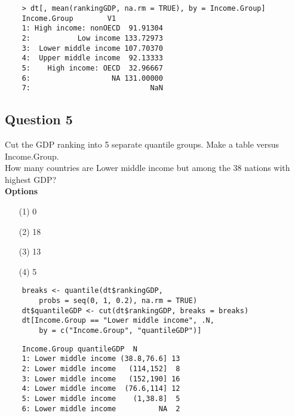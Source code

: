 \documentclass[]{article}
\begin{document}

\begin{framed}
	\begin{verbatim}
	> dt[, mean(rankingGDP, na.rm = TRUE), by = Income.Group]
	Income.Group        V1
	1: High income: nonOECD  91.91304
	2:           Low income 133.72973
	3:  Lower middle income 107.70370
	4:  Upper middle income  92.13333
	5:    High income: OECD  32.96667
	6:                   NA 131.00000
	7:                            NaN
	\end{verbatim}
\end{framed}
\newpage
\subsection*{Question 5}
Cut the GDP ranking into 5 separate quantile groups. Make a table versus Income.Group.
\\
 How many countries are Lower middle income but among the 38 nations with highest GDP?\\
\bigskip
\textbf{Options}
\begin{itemize}
\item[(1)] 0
\item[(2)]18
\item[(3)]13
\item[(4)] 5
\end{itemize}


\begin{framed}
	\begin{verbatim}
	breaks <- quantile(dt$rankingGDP, 
	  	probs = seq(0, 1, 0.2), na.rm = TRUE)
	dt$quantileGDP <- cut(dt$rankingGDP, breaks = breaks)
	dt[Income.Group == "Lower middle income", .N, 
	   	by = c("Income.Group", "quantileGDP")]
	   		\end{verbatim}
\end{framed}
	   \begin{verbatim}	
	Income.Group quantileGDP  N
	1: Lower middle income (38.8,76.6] 13
	2: Lower middle income   (114,152]  8
	3: Lower middle income   (152,190] 16
	4: Lower middle income  (76.6,114] 12
	5: Lower middle income    (1,38.8]  5
	6: Lower middle income          NA  2
  \end{verbatim}
\end{document}
